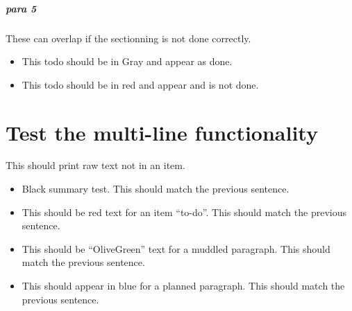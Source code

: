 \paragraph{para 5}
\label{autosec:7}
These can overlap if the sectionning is not done correctly.
    \begin{itemize}[noitemsep]
        \item {\color{Gray}This todo should be in Gray and appear as done.}
        \item {\color{red}This todo should be in red and appear and is not done.}
    \end{itemize}
\chapter{Test the multi-line functionality}
\label{autosec:7}
This should print raw text not in an item.
    \begin{itemize}[noitemsep]
        \item Black summary test.
This should match the previous sentence.
        \item {\color{red}This should be red text for an item ``to-do''.}
{\color{red}This should match the previous sentence.}
        \item {\color{OliveGreen}This should be ``OliveGreen'' text for a muddled paragraph.}
{\color{OliveGreen}This should match the previous sentence.}
        \item {\color{blue}This should appear in blue for a planned paragraph.}
{\color{blue}This should match the previous sentence.}
    \end{itemize}
